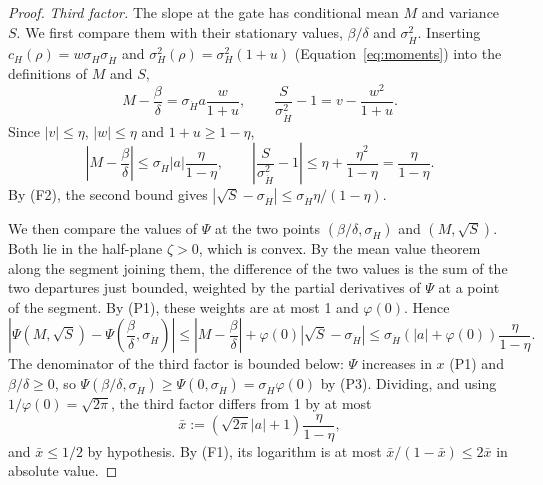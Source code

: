 \documentclass[a4paper,11pt]{article}
\theoremstyle{definition}
\newcommand{\1}{\mathbbm{1}}
\begin{document}
\begin{proof}
\emph{Third factor.} The slope at the gate has conditional mean $M$ and variance $S$. We first compare them with their stationary values, $\beta/\delta$ and $\sigma_{\dot{H}}^{2}$. Inserting $c_{H}(\rho)=w\sigma_{H}\sigma_{\dot{H}}$ and $\sigma_{H}^{2}(\rho)=\sigma_{H}^{2}(1+u)$ (Equation~\eqref{eq:moments}) into the definitions of $M$ and $S$,
\begin{equation*}
M-\frac{\beta}{\delta}=\sigma_{\dot{H}}a\frac{w}{1+u}, \qquad \frac{S}{\sigma_{\dot{H}}^{2}}-1=v-\frac{w^{2}}{1+u}.
\end{equation*}
Since $|v|\le\eta$, $|w|\le\eta$ and $1+u\ge 1-\eta$,
\begin{equation*}
\left|M-\frac{\beta}{\delta}\right|\le\sigma_{\dot{H}}|a|\frac{\eta}{1-\eta}, \qquad \left|\frac{S}{\sigma_{\dot{H}}^{2}}-1\right|\le\eta+\frac{\eta^{2}}{1-\eta}=\frac{\eta}{1-\eta}.
\end{equation*}
By (F2), the second bound gives $|\sqrt{S}-\sigma_{\dot{H}}|\le\sigma_{\dot{H}}\eta/(1-\eta)$.

We then compare the values of $\Psi$ at the two points $\left(\beta/\delta,\sigma_{\dot{H}}\right)$ and $\left(M,\sqrt{S}\right)$. Both lie in the half-plane $\zeta>0$, which is convex. By the mean value theorem along the segment joining them, the difference of the two values is the sum of the two departures just bounded, weighted by the partial derivatives of $\Psi$ at a point of the segment. By (P1), these weights are at most 1 and $\varphi(0)$. Hence
\begin{equation*}
\left|\Psi\left(M,\sqrt{S}\right)-\Psi\left(\frac{\beta}{\delta},\sigma_{\dot{H}}\right)\right|\le\left|M-\frac{\beta}{\delta}\right|+\varphi(0)\left|\sqrt{S}-\sigma_{\dot{H}}\right|\le\sigma_{\dot{H}}\left(|a|+\varphi(0)\right)\frac{\eta}{1-\eta}.
\end{equation*}
The denominator of the third factor is bounded below: $\Psi$ increases in $x$ (P1) and $\beta/\delta\ge 0$, so $\Psi\left(\beta/\delta,\sigma_{\dot{H}}\right)\ge\Psi\left(0,\sigma_{\dot{H}}\right)=\sigma_{\dot{H}}\varphi(0)$ by (P3). Dividing, and using $1/\varphi(0)=\sqrt{2\pi}$, the third factor differs from 1 by at most
\begin{equation*}
\bar{x}:=\left(\sqrt{2\pi}|a|+1\right)\frac{\eta}{1-\eta},
\end{equation*}
and $\bar{x}\le 1/2$ by hypothesis. By (F1), its logarithm is at most $\bar{x}/(1-\bar{x})\le 2\bar{x}$ in absolute value.

\end{proof}
\end{document}
